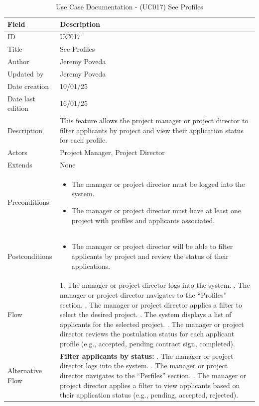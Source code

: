 \documentclass{scrreprt}
\begin{document}
\begin{table}[H]
	\centering
	\begin{tabular}{|p{3cm}|p{10cm}|}
		\hline
		\textbf{Field} & \textbf{Description} \\ \hline
		ID & UC017 \\ \hline
		Title & See Profiles \\ \hline
		Author & Jeremy Poveda \\ \hline
		Updated by & Jeremy Poveda\\ \hline
		Date creation & 10/01/25 \\ \hline
		Date last edition & 16/01/25 \\ \hline
		Description & 
		This feature allows the project manager or project director to filter applicants by project and view their application status for each profile. \\ \hline
		Actors & Project Manager, Project Director \\ \hline
		Extends & None \\ \hline
		Preconditions & 
		\begin{itemize}
			\item The manager or project director must be logged into the system.
			\item The manager or project director must have at least one project with profiles and applicants associated.
		\end{itemize} \\ \hline
		Postconditions & 
		\begin{itemize}
			\item The manager or project director will be able to filter applicants by project and review the status of their applications.
		\end{itemize} \\ \hline
		Flow & 
		1. The manager or project director logs into the system. \newline
		2. The manager or project director navigates to the “Profiles” section. \newline
		3. The manager or project director applies a filter to select the desired project. \newline
		4. The system displays a list of applicants for the selected project. \newline
		5. The manager or project director reviews the postulation status for each applicant profile (e.g., accepted, pending contract sign, completed). \\ \hline
		Alternative Flow & 
		\textbf{Filter applicants by status:} \newline
		1. The manager or project director logs into the system. \newline
		2. The manager or project director navigates to the “Perfiles” section. \newline
		3. The manager or project director applies a filter to view applicants based on their application status (e.g., pending, accepted, rejected). \\ \hline
	\end{tabular}
	\caption{Use Case Documentation - (UC017) See Profiles }
	\label{table:UC017}
\end{table}
\end{document}
